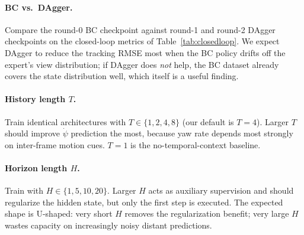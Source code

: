 \documentclass[10pt,twocolumn,letterpaper]{article}
\begin{document}
\paragraph{BC vs.\ DAgger.} Compare the round-0 BC checkpoint against round-1 and round-2 DAgger checkpoints on the closed-loop metrics of Table~\ref{tab:closedloop}. We expect DAgger to reduce the tracking RMSE most when the BC policy drifts off the expert's view distribution; if DAgger does \emph{not} help, the BC dataset already covers the state distribution well, which itself is a useful finding.

\paragraph{History length $T$.} Train identical architectures with $T \in \{1, 2, 4, 8\}$ (our default is $T{=}4$). Larger $T$ should improve $\dot{\psi}$ prediction the most, because yaw rate depends most strongly on inter-frame motion cues. $T{=}1$ is the no-temporal-context baseline.

\paragraph{Horizon length $H$.} Train with $H \in \{1, 5, 10, 20\}$. Larger $H$ acts as auxiliary supervision and should regularize the hidden state, but only the first step is executed. The expected shape is U-shaped: very short $H$ removes the regularization benefit; very large $H$ wastes capacity on increasingly noisy distant predictions.
\end{document}
